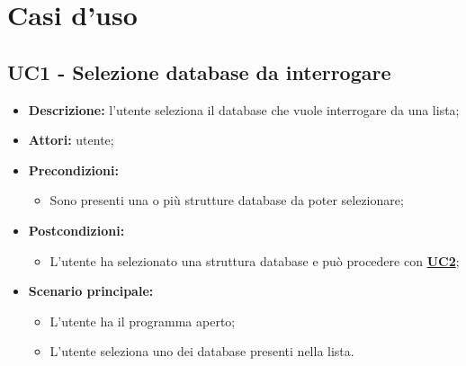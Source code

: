 \documentclass[5pt]{article}
\begin{document}
\section{Casi d'uso}



\subsection{UC1 - Selezione database da interrogare}
\label{sec:UC1}
\begin{itemize}
    \item \textbf{Descrizione:} l’utente seleziona il database che vuole interrogare da una lista;
    \item \textbf{Attori:} utente;
    \item \textbf{Precondizioni:}
    \begin{itemize}
        \item Sono presenti una o più strutture database da poter selezionare;
    \end{itemize}
    \item \textbf{Postcondizioni:}
    \begin{itemize}
        \item L’utente ha selezionato una struttura database e può procedere con \hyperref[sec:UC2]{\textbf{UC2}};
    \end{itemize}
    \item \textbf{Scenario principale:}
    \begin{itemize}
        \item L’utente ha il programma aperto;
        \item L’utente seleziona uno dei database presenti nella lista.
    \end{itemize}
\end{itemize}
\end{document}
